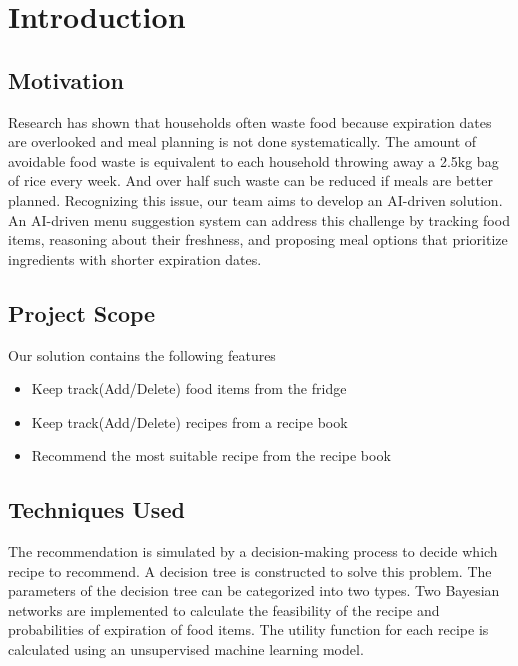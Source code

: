 \section{Introduction}
\subsection{Motivation}
Research has shown that households often waste food because expiration dates are overlooked and meal planning is not done systematically. The amount of avoidable food waste is equivalent to each household throwing away a 2.5kg bag of rice every week. And over half such waste can be reduced if meals are better planned. Recognizing this issue, our team aims to develop an AI-driven solution. An AI-driven menu suggestion system can address this challenge by tracking food items, reasoning about their freshness, and proposing meal options that prioritize ingredients with shorter expiration dates.
\subsection{Project Scope}
Our solution contains the following features
\begin{itemize}
    \item Keep track(Add/Delete) food items from the fridge
    \item Keep track(Add/Delete) recipes from a recipe book
    \item Recommend the most suitable recipe from the recipe book
\end{itemize}
\subsection{Techniques Used}
The recommendation is simulated by a decision-making process to decide which recipe to recommend. A decision tree is constructed to solve this problem. The parameters of the decision tree can be categorized into two types. Two Bayesian networks are implemented to calculate the feasibility of the recipe and probabilities of expiration of food items. The utility function for each recipe is calculated using an unsupervised machine learning model. 

